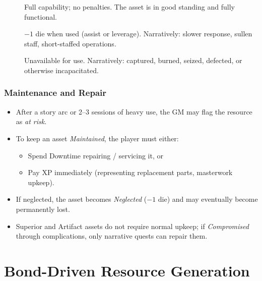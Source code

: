 \begin{description}
    \item[] Full capability; no penalties. The asset is in good standing and fully functional.
    \item[] \(-1\) die when used (assist or leverage). Narratively: slower response, sullen staff, short-staffed operations.
    \item[] Unavailable for use. Narratively: captured, burned, seized, defected, or otherwise incapacitated.
\end{description}

\subsubsection{Maintenance and Repair}\label{subsec:asset_maintenance}

\begin{itemize}
    \item After a story arc or 2--3 sessions of heavy use, the GM may flag the resource as \emph{at risk}.
    \item To keep an asset \emph{Maintained}, the player must either:
        \begin{itemize}
            \item Spend Downtime repairing / servicing it, or
            \item Pay XP immediately (representing replacement parts, masterwork upkeep).
        \end{itemize}
    \item If neglected, the asset becomes \emph{Neglected} (\(-1\) die) and may eventually become permanently lost.
    \item Superior and Artifact assets do not require normal upkeep; if \emph{Compromised} through complications, only narrative quests can repair them.
\end{itemize}

\section{Bond-Driven Resource Generation}\label{sec:bond_resources}

